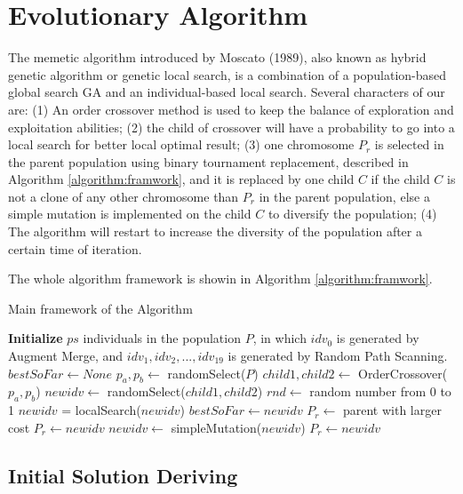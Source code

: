 \documentclass[journal,twoside,web]{ieeecolor}
\begin{document}
\section{Evolutionary Algorithm}
The memetic algorithm introduced by Moscato (1989)\cite{Moscato1989}, also known as hybrid genetic algorithm or genetic local search, is a combination of a population-based global search GA and an individual-based local search. Several characters of our are: (1) An order crossover method is used to keep the balance of exploration and exploitation abilities; (2) the child of crossover will have a probability to go into a local search for better local optimal result; (3) one chromosome $P_r$ is selected in the parent population using binary tournament replacement, described in Algorithm \ref{algorithm:framwork}, and it is replaced by one child $C$ if the child $C$ is not a clone of any other chromosome than $P_r$ in the parent population, else a simple mutation is implemented on the child $C$ to diversify the population; (4) The algorithm will restart to increase the diversity of the population after a certain time of iteration. 
\par
The whole algorithm framework is showin in Algorithm \ref{algorithm:framwork}.
\begin{algorithm}
\caption{Main framework of the Algorithm}
\label{algorithm:framwork}
\begin{algorithmic} [1]

\STATE \textbf{Initialize} $ps$ individuals in the population $P$, in which $idv_0$ is generated by Augment Merge, and $idv_1,idv_2,...,idv_19$ is generated by Random Path Scanning.
\STATE $bestSoFar\leftarrow None$
\REPEAT
\REPEAT
\STATE $p_a, p_b \leftarrow$ randomSelect($P$)
\STATE $child1, child2 \leftarrow$ OrderCrossover($p_a,p_b$)
\STATE $newidv\leftarrow$ randomSelect($child1, child2$)
\STATE $rnd \leftarrow$ random number from 0 to 1
\STATE $newidv$ = localSearch($newidv$)
\ENDIF
{}
\STATE $bestSoFar\leftarrow newidv$
\ENDIF
\STATE $P_r\leftarrow$ parent with larger cost
\STATE $P_r\leftarrow newidv$ 
\ELSE 
\STATE $newidv\leftarrow$ simpleMutation($newidv$)
\STATE $P_r\leftarrow newidv$ 
\ENDIF
\ENDIF
{}
\end{algorithmic}
\end{algorithm}
\subsection{Initial Solution Deriving}
\end{document}
